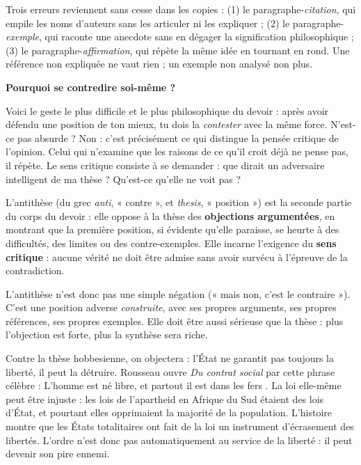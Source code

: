 \documentclass[11pt]{article}
\newcommand{\cle}[1]{{\popxbold\color{popdark}#1}}
\newcounter{popsec}
\newcounter{popsub}
\newcommand{\courssub}[1]{%
  \stepcounter{popsub}%
  \par\vspace{9pt}\noindent{\popxbold\fontsize{11.5}{13}\selectfont\color{popink}{\color{poporange}\thepopsec.\thepopsub}\hspace{6pt}#1}\par\nopagebreak\vspace{4pt}
}
\begin{document}
\begin{attention}
Trois erreurs reviennent sans cesse dans les copies : (1) le paragraphe-\emph{citation}, qui empile les noms d'auteurs sans les articuler ni les expliquer ; (2) le paragraphe-\emph{exemple}, qui raconte une anecdote sans en dégager la signification philosophique ; (3) le paragraphe-\emph{affirmation}, qui répète la même idée en tournant en rond. Une référence non expliquée ne vaut rien ; un exemple non analysé non plus.
\end{attention}

\courssub{L'antithèse : l'exigence du sens critique}

\textbf{Pourquoi se contredire soi-même ?}\par
Voici le geste le plus difficile et le plus philosophique du devoir : après avoir défendu une position de ton mieux, tu dois la \emph{contester} avec la même force. N'est-ce pas absurde ? Non : c'est précisément ce qui distingue la pensée critique de l'opinion. Celui qui n'examine que les raisons de ce qu'il croit déjà ne pense pas, il répète. Le sens critique consiste à se demander : que dirait un adversaire intelligent de ma thèse ? Qu'est-ce qu'elle ne voit pas ?

\begin{definition}[L'antithèse]
L'\cle{antithèse} (du grec \emph{anti}, « contre », et \emph{thesis}, « position ») est la seconde partie du corps du devoir : elle oppose à la thèse des \textbf{objections argumentées}, en montrant que la première position, si évidente qu'elle paraisse, se heurte à des difficultés, des limites ou des contre-exemples. Elle incarne l'exigence du \textbf{sens critique} : aucune vérité ne doit être admise sans avoir survécu à l'épreuve de la contradiction.
\end{definition}

L'antithèse n'est donc pas une simple négation (« mais non, c'est le contraire »). C'est une position adverse \emph{construite}, avec ses propres arguments, ses propres références, ses propres exemples. Elle doit être aussi sérieuse que la thèse : plus l'objection est forte, plus la synthèse sera riche.

\begin{exemplebox}
Contre la thèse hobbesienne, on objectera : l'État ne garantit pas toujours la liberté, il peut la détruire. Rousseau ouvre \emph{Du contrat social} par cette phrase célèbre : \guillemotleft L'homme est né libre, et partout il est dans les fers \guillemotright. La loi elle-même peut être injuste : les lois de l'apartheid en Afrique du Sud étaient des lois d'État, et pourtant elles opprimaient la majorité de la population. L'histoire montre que les États totalitaires ont fait de la loi un instrument d'écrasement des libertés. L'ordre n'est donc pas automatiquement au service de la liberté : il peut devenir son pire ennemi.
\end{exemplebox}
\end{document}
